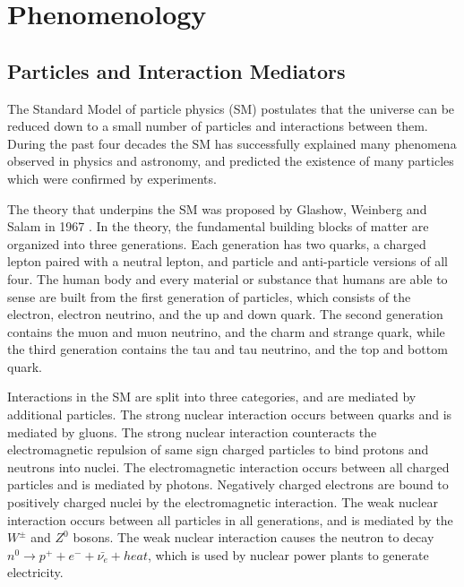 \chapter{Phenomenology}
\label{wrBosonAndHeavyNu}
\section{Particles and Interaction Mediators}
The Standard Model of particle physics (SM) postulates that the universe can be reduced down to a small 
number of particles and interactions between them.  During the past four decades the SM has successfully 
explained many phenomena observed in physics and astronomy, and predicted the existence of many particles 
which were confirmed by experiments.

The theory that underpins the SM was proposed by Glashow, Weinberg and Salam in 1967 \cite{weinbergSM,salamSM}.  
In the theory, the fundamental building blocks of matter are organized into three generations.  Each 
generation has two quarks, a charged lepton paired with a neutral lepton, and particle and anti-particle 
versions of all four.  The human body and every material or substance that humans are able to sense are 
built from the first generation of particles, which consists of the electron, electron neutrino, and 
the up and down quark.  The second generation contains the muon and muon neutrino, and the charm and 
strange quark, while the third generation contains the tau and tau neutrino, and the top and bottom 
quark.

Interactions in the SM are split into three categories, and are mediated by additional particles.  The 
strong nuclear interaction occurs between quarks and is mediated by gluons.  The strong nuclear interaction 
counteracts the electromagnetic repulsion of same sign charged particles to bind protons and neutrons 
into nuclei.  The electromagnetic interaction occurs between all charged particles and is mediated by 
photons.  Negatively charged electrons are bound to positively charged nuclei by the electromagnetic 
interaction.  The weak nuclear interaction occurs between all particles in all generations, and is 
mediated by the $W^{\pm}$ and $Z^{0}$ bosons.  The weak nuclear interaction causes the neutron to 
decay $n^{0} \rightarrow p^{+} + e^{-} + \bar{\nu_{e}} + heat$, which is used by nuclear power plants to 
generate electricity.

